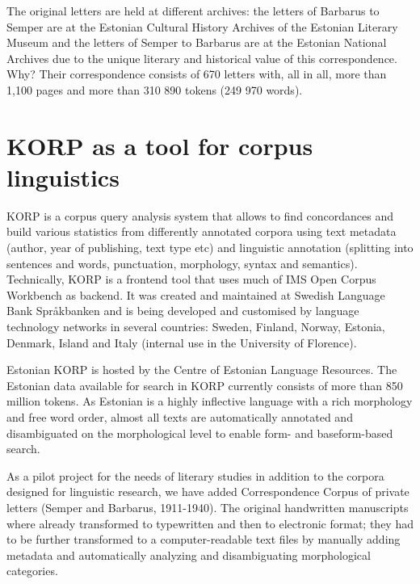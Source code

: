 \documentclass[runningheads]{llncs}
\begin{document}
The original letters are held at different archives: the letters of Barbarus to Semper are at the Estonian Cultural History Archives of the Estonian Literary Museum and the letters of Semper to Barbarus are at the Estonian National Archives due to the unique literary and historical value of this correspondence. Why? Their correspondence consists of 670 letters with, all in all, more than 1,100 pages and more than 310 890 tokens (249 970 words). 


\section{KORP as a tool for corpus linguistics}

KORP is a corpus query analysis system that allows to find concordances and build various statistics from differently annotated corpora using text metadata (author, year of publishing, text type etc) and linguistic annotation (splitting into sentences and words, punctuation, morphology, syntax and semantics). Technically, KORP is a frontend tool that uses much of IMS Open Corpus Workbench as backend. It was created and maintained at Swedish Language Bank Språkbanken \cite{BORIN12.248} and is being developed and customised by language technology networks in several countries: Sweden, Finland, Norway, Estonia, Denmark, Island and Italy (internal use in the University of Florence).  

Estonian KORP is hosted by the Centre of Estonian Language Resources. The Estonian data available for search in KORP currently consists of more than 850 million tokens. As Estonian is a highly inflective language with a rich morphology and free word order, almost all texts are automatically annotated and disambiguated on the morphological level to enable form- and baseform-based search.


As a pilot project for the needs of literary studies in addition to the corpora designed for linguistic research, we have added Correspondence Corpus of private letters (Semper and Barbarus, 1911-1940). The original handwritten manuscripts where already transformed to typewritten and then to electronic format; they had to be further transformed to a computer-readable text files by manually adding metadata and automatically analyzing and disambiguating morphological categories. 
\end{document}
